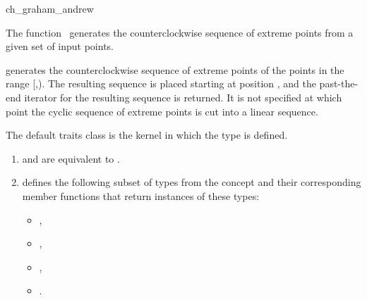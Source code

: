 
\begin{ccRefFunction}{ch_graham_andrew}  %

\ccDefinition
  
The function \ccRefName\ generates the counterclockwise sequence of extreme
points from a given set of input points.



            {generates the counterclockwise sequence of extreme points
            of the points in the range [,).
            The resulting sequence is placed starting at position
            , and the past-the-end iterator for the resulting
            sequence is returned. It is not specified at which point the
            cyclic sequence of extreme points is cut into a linear sequence.
            \ccPrecond{ %
            The source range [\ccc{first},\ccc{beyond}) does not contain
            \ccc{result}.}}

The default traits class  is the kernel in which the
type  is defined.

\begin{enumerate}
   \item    {} and 
            are equivalent to .
   \item    {} defines the following subset of types from
            the concept  and their corresponding member
            functions that return instances of these types:
            \begin{itemize}
                \item {},
                \item {}, 
                \item {},
		\item {}.
            \end{itemize}
\end{enumerate}


\end{ccRefFunction}
